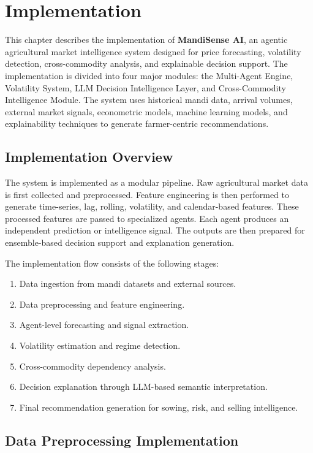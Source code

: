 \documentclass[12pt,a4paper]{report}
\begin{document}
\chapter{Implementation}

This chapter describes the implementation of \textbf{MandiSense AI}, an agentic agricultural market intelligence system designed for price forecasting, volatility detection, cross-commodity analysis, and explainable decision support. The implementation is divided into four major modules: the Multi-Agent Engine, Volatility System, LLM Decision Intelligence Layer, and Cross-Commodity Intelligence Module. The system uses historical mandi data, arrival volumes, external market signals, econometric models, machine learning models, and explainability techniques to generate farmer-centric recommendations.

\section{Implementation Overview}

The system is implemented as a modular pipeline. Raw agricultural market data is first collected and preprocessed. Feature engineering is then performed to generate time-series, lag, rolling, volatility, and calendar-based features. These processed features are passed to specialized agents. Each agent produces an independent prediction or intelligence signal. The outputs are then prepared for ensemble-based decision support and explanation generation.

The implementation flow consists of the following stages:

\begin{enumerate}
    \item Data ingestion from mandi datasets and external sources.
    \item Data preprocessing and feature engineering.
    \item Agent-level forecasting and signal extraction.
    \item Volatility estimation and regime detection.
    \item Cross-commodity dependency analysis.
    \item Decision explanation through LLM-based semantic interpretation.
    \item Final recommendation generation for sowing, risk, and selling intelligence.
\end{enumerate}

\section{Data Preprocessing Implementation}
\end{document}
